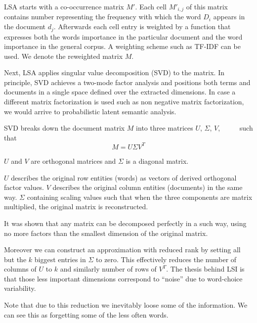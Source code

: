     LSA starts with a co-occurrence matrix $M'$. 
    Each cell $M'_{i,j}$ of this matrix contains number representing the frequency with which  the  word $D_i$ appears in the document $d_j$.
    Afterwards each cell entry is weighted by a function that expresses both the words importance in the particular document and the word importance in the general corpus.
    A weighting scheme such as TF-IDF can be used.
    We denote the reweighted matrix $M$. 
    
    Next, LSA applies singular value decomposition (SVD) to the matrix.
    In principle, SVD achieves a two-mode factor analysis and positions both terms and documents in a single space defined over the extracted dimensions.
    In case a different matrix factorization is used such as non negative matrix factorization, we would arrive to probabilistic latent semantic analysis.
    
    SVD breaks down the document matrix $M$ into three matrices $U$, $\Sigma$, $V$,\cite{papadimitriou2000latent} %
   ~\cite{maas2011learning} %
   ~\cite{wiemer2004latent} %
   ~\cite{landauer1998introduction} %
    such that $$M=U \Sigma V^T$$ 

    $U$ and $V$ are orthogonal matrices and $\Sigma$ is a diagonal matrix.
    
    {}

    $U$ describes the original row entities (words) as vectors of derived orthogonal  factor values. 
    $V$ describes the original column entities (documents) in the same way.
    $\Sigma$ containing scaling values such that when the three components are matrix multiplied, the original matrix is reconstructed.

    It was shown that any matrix can be decomposed perfectly in a such way, using no more factors than the smallest dimension of the original matrix.
    
    Moreover we can construct an approximation with reduced rank by setting all but the $k$ biggest entries in $\Sigma$ to zero. 
    This effectively reduces the number of columns of $U$ to $k$ and similarly number of rows of $V^T$.
    The thesis behind LSI is that those less important dimensions correspond to “noise” due to word-choice variability.
    
    Note that due to this reduction we inevitably loose some of the information. 
    We can see this as forgetting some of the less often words.

